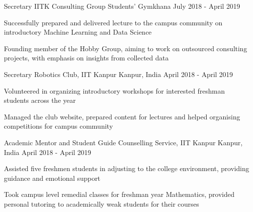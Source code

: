 \begin{cventries}

  \cventry
    {Secretary}
    {IITK Consulting Group}
    {Students' Gymkhana} 
    {July 2018 - April 2019}
    {
      \begin{cvitems}
        \item {Successfully prepared and delivered lecture to the campus community on introductory Machine Learning and Data Science}
        \item {Founding member of the Hobby Group, aiming to work on outsourced consulting projects, with emphasis on insights from collected data}
      \end{cvitems}
    }

  \cventry
    {Secretary}
    {Robotics Club, IIT Kanpur}
    {Kanpur, India} 
    {April 2018 - April 2019} 
    {
      \begin{cvitems}
        \item {Volunteered in organizing introductory workshops for interested freshman students across the year}
        \item{Managed the club website, prepared content for lectures and helped organising competitions for campus community}
        \end{cvitems}
    }

  \cventry
    {Academic Mentor and Student Guide}
    {Counselling Service, IIT Kanpur}
    {Kanpur, India}
    {April 2018 - April 2019}
    {
      \begin{cvitems} %
        \item {Assisted five freshmen students in adjusting to the college environment, providing guidance and emotional support}
        \item{Took campus level remedial classes for freshman year Mathematics, provided personal tutoring to academically weak students for their courses}
      \end{cvitems}
    }

\end{cventries}
